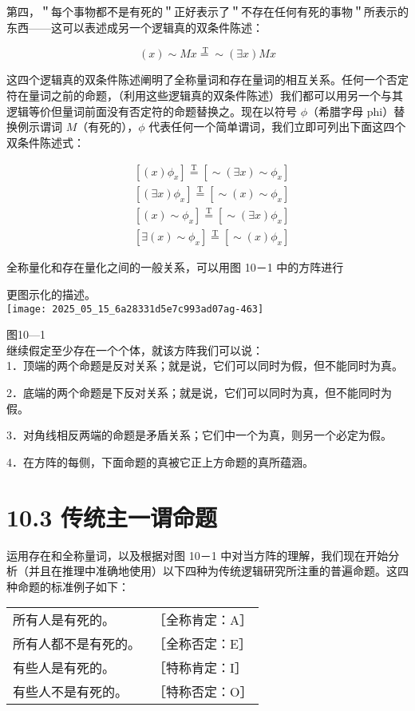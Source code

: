 第四，＂每个事物都不是有死的＂正好表示了＂不存在任何有死的事物＂所表示的东西——这可以表述成另一个逻辑真的双条件陈述：

$$
(x) \sim M x \stackrel{\mathrm{~T}}{=} \sim(\exists x) M x
$$

这四个逻辑真的双条件陈述阐明了全称量词和存在量词的相互关系。任何一个否定符在量词之前的命题，（利用这些逻辑真的双条件陈述）我们都可以用另一个与其逻辑等价但量词前面没有否定符的命题替换之。现在以符号 $\phi$（希腊字母 phi）替换例示谓词 $M$（有死的），$\phi$ 代表任何一个简单谓词，我们立即可列出下面这四个双条件陈述式：

$$
\begin{aligned}
& {\left[(x) \phi_{x}\right] \stackrel{\mathrm{T}}{=}\left[\sim(\exists x) \sim \phi_{x}\right]} \\
& {\left[(\exists x) \phi_{x}\right] \stackrel{\mathrm{T}}{=}\left[\sim(x) \sim \phi_{x}\right]} \\
& {\left[(x) \sim \phi_{x}\right] \stackrel{\mathrm{T}}{=}\left[\sim(\exists x) \phi_{x}\right]} \\
& {\left[\exists(x) \sim \phi_{x}\right] \stackrel{\mathrm{T}}{=}\left[\sim(x) \phi_{x}\right]}
\end{aligned}
$$

全称量化和存在量化之间的一般关系，可以用图 10－1 中的方阵进行

更图示化的描述。\\
\texttt{[image: 2025\_05\_15\_6a28331d5e7c993ad07ag-463]}

图10—1\\
继续假定至少存在一个个体，就该方阵我们可以说：\\
1．顶端的两个命题是反对关系；就是说，它们可以同时为假，但不能同时为真。

2．底端的两个命题是下反对关系；就是说，它们可以同时为真，但不能同时为假。

3．对角线相反两端的命题是矛盾关系；它们中一个为真，则另一个必定为假。

4．在方阵的每侧，下面命题的真被它正上方命题的真所蕴涵。

\section*{10.3 传统主一谓命题}
运用存在和全称量词，以及根据对图 10－1 中对当方阵的理解，我们现在开始分析（并且在推理中准确地使用）以下四种为传统逻辑研究所注重的普遍命题。这四种命题的标准例子如下：

\begin{center}
\begin{tabular}{ll}
所有人是有死的。 & ［全称肯定：A］ \\
所有人都不是有死的。 & ［全称否定：E］ \\
有些人是有死的。 & ［特称肯定：I］ \\
有些人不是有死的。 & ［特称否定：O］ \\
\end{tabular}
\end{center}

